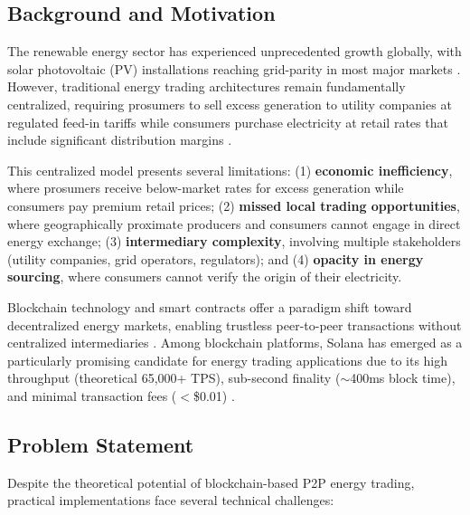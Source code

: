 \documentclass[conference]{IEEEtran}
\begin{document}
\subsection{Background and Motivation}

The renewable energy sector has experienced unprecedented growth globally, with solar photovoltaic (PV) installations reaching grid-parity in most major markets \cite{irena2024}. However, traditional energy trading architectures remain fundamentally centralized, requiring prosumers to sell excess generation to utility companies at regulated feed-in tariffs while consumers purchase electricity at retail rates that include significant distribution margins \cite{mengelkamp2018}.

This centralized model presents several limitations: (1) \textbf{economic inefficiency}, where prosumers receive below-market rates for excess generation while consumers pay premium retail prices; (2) \textbf{missed local trading opportunities}, where geographically proximate producers and consumers cannot engage in direct energy exchange; (3) \textbf{intermediary complexity}, involving multiple stakeholders (utility companies, grid operators, regulators); and (4) \textbf{opacity in energy sourcing}, where consumers cannot verify the origin of their electricity.

Blockchain technology and smart contracts offer a paradigm shift toward decentralized energy markets, enabling trustless peer-to-peer transactions without centralized intermediaries \cite{andoni2019}. Among blockchain platforms, Solana has emerged as a particularly promising candidate for energy trading applications due to its high throughput (theoretical 65,000+ TPS), sub-second finality ($\sim$400ms block time), and minimal transaction fees ($<$\$0.01) \cite{yakovenko2018}.

\subsection{Problem Statement}

Despite the theoretical potential of blockchain-based P2P energy trading, practical implementations face several technical challenges:
\end{document}
